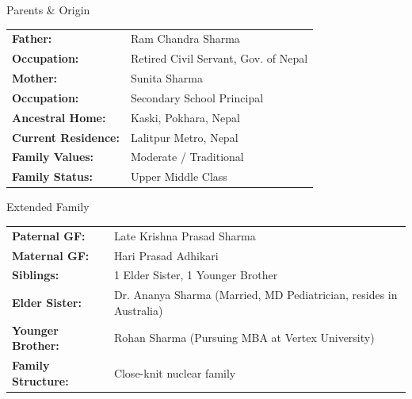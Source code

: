 \documentclass[11pt,a4paper]{article}
\begin{document}
\begin{minipage}[t]{0.48\textwidth}
  \vspace{0pt}
  \begin{sectionbox}{Parents \& Origin}
    \begin{tabularx}{\textwidth}{@{}l X@{}}
      \textbf{Father:} & Ram Chandra Sharma \\
      \textbf{Occupation:} & Retired Civil Servant, Gov. of Nepal \\
      \textbf{Mother:} & Sunita Sharma \\
      \textbf{Occupation:} & Secondary School Principal \\
      \textbf{Ancestral Home:} & Kaski, Pokhara, Nepal \\
      \textbf{Current Residence:} & Lalitpur Metro, Nepal \\
      \textbf{Family Values:} & Moderate / Traditional \\
      \textbf{Family Status:} & Upper Middle Class \\
    \end{tabularx}
  \end{sectionbox}
\end{minipage}%
\hfill
\begin{minipage}[t]{0.48\textwidth}
  \vspace{0pt}
  \begin{sectionbox}{Extended Family}
    \begin{tabularx}{\textwidth}{@{}l X@{}}
      \textbf{Paternal GF:} & Late Krishna Prasad Sharma \\
      \textbf{Maternal GF:} & Hari Prasad Adhikari \\
      \textbf{Siblings:} & 1 Elder Sister, 1 Younger Brother \\
      \textbf{Elder Sister:} & Dr. Ananya Sharma (Married, MD Pediatrician, resides in Australia) \\
      \textbf{Younger Brother:} & Rohan Sharma (Pursuing MBA at Vertex University) \\
      \textbf{Family Structure:} & Close-knit nuclear family \\
    \end{tabularx}
  \end{sectionbox}
\end{minipage}

\par\vspace{2.5em}
\end{document}
